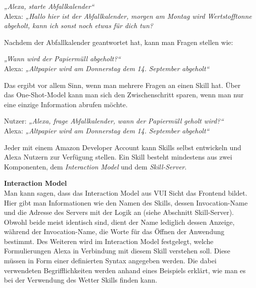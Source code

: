 \begin{center} %
\textit{„Alexa, starte Abfallkalender“}\\
\textcolor{mybluelight}{Alexa: \textit{„Hallo hier ist der Abfallkalender, morgen am Montag wird Wertstofftonne abgeholt, kann ich sonst noch etwas für dich tun?}}
\end{center}
Nachdem der Abfallkalender geantwortet hat, kann man Fragen stellen wie: 

\begin{center} %
\textit{„Wann wird der Papiermüll abgeholt?“}\\
\textcolor{mybluelight}{Alexa: \textit{„Altpapier wird am Donnerstag dem 14. September abgeholt“}}
\end{center}

Das ergibt vor allem Sinn, wenn man mehrere Fragen an einen Skill hat. Über das One-Shot-Model kann man sich den Zwischenschritt sparen, wenn man nur eine einzige Information abrufen möchte.

\begin{center} %
Nutzer: \textit{„Alexa, frage Abfallkalender, wann der Papiermüll geholt wird?“}\\
\textcolor{mybluelight}{Alexa: \textit{„Altpapier wird am Donnerstag dem 14. September abgeholt“}}
\end{center}

Jeder mit einem Amazon Developer Account \cite{amazon-developer} kann Skills selbst entwickeln und Alexa Nutzern zur Verfügung stellen. Ein Skill besteht mindestens aus zwei Komponenten, dem \textit{Interaction Model} und dem \textit{Skill-Server}. 

\textbf{Interaction Model}\\
Man kann sagen, dass das Interaction Model aus \ac{VUI} Sicht das Frontend bildet. Hier gibt man Informationen wie den Namen des Skills, dessen Invocation-Name und die Adresse des Servers mit der Logik an (siehe Abschnitt Skill-Server). Obwohl beide meist identisch sind, dient der Name lediglich dessen Anzeige, während der Invocation-Name, die Worte für das Öffnen der Anwendung bestimmt. Des Weiteren wird im Interaction Model festgelegt, welche Formulierungen Alexa in Verbindung mit diesem Skill verstehen soll. Diese müssen in Form einer definierten Syntax angegeben werden. Die dabei verwendeten Begrifflichkeiten werden anhand eines Beispiels erklärt, wie man es bei der Verwendung des Wetter Skills finden kann.

